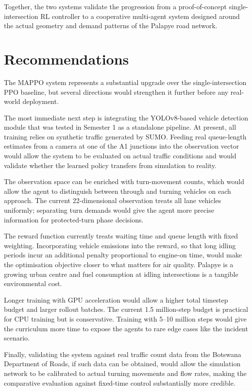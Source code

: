 \documentclass[11pt, a4paper]{report}
\begin{document}
Together, the two systems validate the progression from a proof-of-concept single-intersection RL controller to a cooperative multi-agent system designed around the actual geometry and demand patterns of the Palapye road network.

\chapter{Recommendations}

The MAPPO system represents a substantial upgrade over the single-intersection PPO baseline, but several directions would strengthen it further before any real-world deployment.

The most immediate next step is integrating the YOLOv8-based vehicle detection module that was tested in Semester 1 as a standalone pipeline. At present, all training relies on synthetic traffic generated by SUMO. Feeding real queue-length estimates from a camera at one of the A1 junctions into the observation vector would allow the system to be evaluated on actual traffic conditions and would validate whether the learned policy transfers from simulation to reality.

The observation space can be enriched with turn-movement counts, which would allow the agent to distinguish between through and turning vehicles on each approach. The current 22-dimensional observation treats all lane vehicles uniformly; separating turn demands would give the agent more precise information for protected-turn phase decisions.

The reward function currently treats waiting time and queue length with fixed weighting. Incorporating vehicle emissions into the reward, so that long idling periods incur an additional penalty proportional to engine-on time, would make the optimisation objective closer to what matters for air quality. Palapye is a growing urban centre and fuel consumption at idling intersections is a tangible environmental cost.

Longer training with GPU acceleration would allow a higher total timestep budget and larger rollout batches. The current 1.5 million-step budget is practical for CPU training but is conservative. Training with 5--10 million steps would give the curriculum more time to expose the agents to rare edge cases like the incident scenario.

Finally, validating the system against real traffic count data from the Botswana Department of Roads, if such data can be obtained, would allow the simulation network to be calibrated to actual turning movements and flow rates, making the comparative evaluation against fixed-time control substantially more credible.
\end{document}
